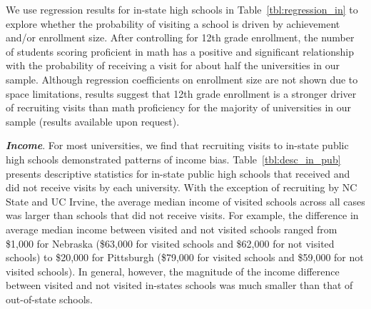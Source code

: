 \documentclass[twoside]{article}
\begin{document}
We use regression results for in-state high schools in Table~\ref{tbl:regression_in} to explore whether the probability of visiting a school is driven by achievement and/or enrollment size. After controlling for 12th grade enrollment, the number of students scoring proficient in math has a positive and significant relationship with the probability of receiving a visit for about half the universities in our sample. Although regression coefficients on enrollment size are not shown due to space limitations, results suggest that 12th grade enrollment is a stronger driver of recruiting visits than math proficiency for the majority of universities in our  sample (results available upon request).

\textbf{\textit{Income}}. For most universities, we find that recruiting visits to in-state public high schools demonstrated patterns of income bias. Table~\ref{tbl:desc_in_pub} presents descriptive statistics for in-state public high schools that received and did not receive visits by each university.  With the exception of recruiting by NC State and UC Irvine, the average median income of visited schools across all cases was larger than schools that did not receive visits. For example, the difference in average median income between visited and not visited schools ranged from \$1,000 for Nebraska (\$63,000 for visited schools and \$62,000 for not visited schools) to \$20,000 for Pittsburgh (\$79,000 for visited schools and \$59,000 for not visited schools). In general, however, the magnitude of the income difference between visited and not visited in-states schools was much smaller than that of out-of-state schools.


\end{document}
